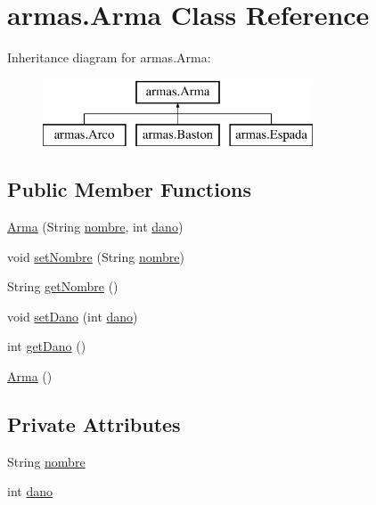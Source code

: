 \hypertarget{classarmas_1_1_arma}{}\section{armas.\+Arma Class Reference}
\label{classarmas_1_1_arma}
Inheritance diagram for armas.\+Arma\+:\begin{figure}[H]
\begin{center}
\leavevmode
\includegraphics[height=2.000000cm]{classarmas_1_1_arma}
\end{center}
\end{figure}
\subsection*{Public Member Functions}
\begin{DoxyCompactItemize}
\item 
\mbox{\hyperlink{classarmas_1_1_arma_a3852166b343463cb023f4a70c490c1a0}{Arma}} (String \mbox{\hyperlink{classarmas_1_1_arma_abdd717c561a99a3436dbfda8129b5581}{nombre}}, int \mbox{\hyperlink{classarmas_1_1_arma_a59396ee4b222360f19c8be08eb7d137b}{dano}})
\item 
void \mbox{\hyperlink{classarmas_1_1_arma_a83ec9eab99a2e8856acebdc4aba25c11}{set\+Nombre}} (String \mbox{\hyperlink{classarmas_1_1_arma_abdd717c561a99a3436dbfda8129b5581}{nombre}})
\item 
String \mbox{\hyperlink{classarmas_1_1_arma_a6e8bac31945491dcdb38506d0d139919}{get\+Nombre}} ()
\item 
void \mbox{\hyperlink{classarmas_1_1_arma_a2916651a71f2cdd274aafd7330a97b0b}{set\+Dano}} (int \mbox{\hyperlink{classarmas_1_1_arma_a59396ee4b222360f19c8be08eb7d137b}{dano}})
\item 
int \mbox{\hyperlink{classarmas_1_1_arma_ac402672c192d5341afa32760938f7e98}{get\+Dano}} ()
\item 
\mbox{\hyperlink{classarmas_1_1_arma_a50ea4ebdc959c0de035d951382e84245}{Arma}} ()
\end{DoxyCompactItemize}
\subsection*{Private Attributes}
\begin{DoxyCompactItemize}
\item 
String \mbox{\hyperlink{classarmas_1_1_arma_abdd717c561a99a3436dbfda8129b5581}{nombre}}
\item 
int \mbox{\hyperlink{classarmas_1_1_arma_a59396ee4b222360f19c8be08eb7d137b}{dano}}
\end{DoxyCompactItemize}


